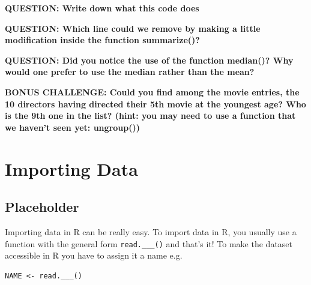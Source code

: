\documentclass[]{book}
\newenvironment{Shaded}{\begin{snugshade}}{\end{snugshade}}
\newcommand{\DataTypeTok}[1]{\textcolor[rgb]{0.13,0.29,0.53}{#1}}
\newcommand{\KeywordTok}[1]{\textcolor[rgb]{0.13,0.29,0.53}{\textbf{#1}}}
\newcommand{\NormalTok}[1]{#1}
\newcommand{\OperatorTok}[1]{\textcolor[rgb]{0.81,0.36,0.00}{\textbf{#1}}}
\newcommand{\StringTok}[1]{\textcolor[rgb]{0.31,0.60,0.02}{#1}}
\begin{document}
\textbf{QUESTION: Write down what this code does}

\textbf{QUESTION: Which line could we remove by making a little modification inside the function summarize()?}

\textbf{QUESTION: Did you notice the use of the function median()? Why would one prefer to use the median rather than the mean?}

\textbf{BONUS CHALLENGE: Could you find among the movie entries, the 10 directors having directed their 5th movie at the youngest age? Who is the 9th one in the list? (hint: you may need to use a function that we haven't seen yet: ungroup())}

\begin{Shaded}
\end{Shaded}

\hypertarget{importing-data}{%
\chapter{Importing Data}\label{importing-data}}

\hypertarget{placeholder}{%
\section{Placeholder}\label{placeholder}}

Importing data in R can be really easy. To import data in R, you usually use a function with the general form \texttt{read.\_\_\_()} and that's it! To make the dataset accessible in R you have to assign it a name e.g.~

\begin{verbatim}
NAME <- read.___()
\end{verbatim}
\end{document}

